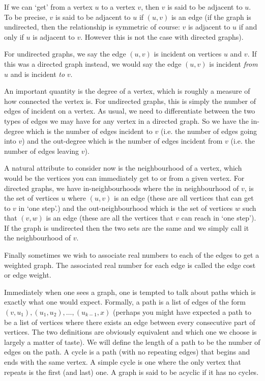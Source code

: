 If we can `get' from a vertex $u$ to a vertex $v$, then $v$ is said to be adjacent to $u$. To be precise, $v$ is said to be adjacent to $u$ if $(u, v)$ is an edge (if the graph is undirected, then the relationship is symmetric of course: $v$ is adjacent to $u$ if and only if $u$ is adjacent to $v$. However this is not the case with directed graphs).

For undirected graphs, we say the edge $(u, v)$ is incident on vertices $u$ and $v$. If this was a directed graph instead, we would say the edge $(u, v)$ is incident \textit{from} $u$ and is incident \textit{to} $v$.

An important quantity is the degree of a vertex, which is roughly a measure of how connected the vertex is. For undirected graphs, this is simply the number of edges of incident on a vertex. As usual, we need to differentiate between the two types of edges we may have for any vertex in a directed graph. So we have the in-degree which is the number of edges incident to $v$ (i.e. the number of edges going into $v$) and the out-degree which is the number of edges incident from $v$ (i.e. the number of edges leaving $v$). 

A natural attribute to consider now is the neighbourhood of a vertex, which would be the vertices you can immediately get to or from a given vertex. For directed graphs, we have in-neighbourhoods where the in neighbourhood of $v$, is the set of vertices $u$ where $(u, v)$ is an edge (these are all vertices that can get to $v$ in `one step'.) and the out-neighbourhood which is the set of vertices $w$ such that $(v, w)$ is an edge (these are all the vertices that $v$ can reach in `one step'). If the graph is undirected then the two sets are the same and we simply call it the neighbourhood of $v$. 

Finally sometimes we wish to associate real numbers to each of the edges to get a weighted graph. The associated real number for each edge is called the edge cost or edge weight.

Immediately when one sees a graph, one is tempted to talk about paths which is exactly what one would expect. Formally, a path is a list of edges of the form $(v, u_1), (u_1, u_2), \dots, (u_{k - 1}, x)$ (perhaps you might have expected a path to be a list of vertices where there exists an edge between every consecutive part of vertices. The two definitions are obviously equivalent and which one we choose is largely a matter of taste). We will define the length of a path to be the number of edges on the path. A cycle is a path (with no repeating edges) that begins and ends with the same vertex. A simple cycle is one where the only vertex that repeats is the first (and last) one. A graph is said to be acyclic if it has no cycles.

